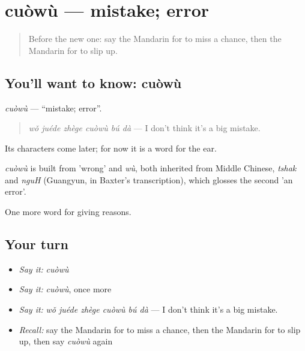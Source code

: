\section[cuòwù]{cuòwù — mistake; error}

\label{lesson:ZH-C356-cuowu}



\begin{quote}
Before the new one: say the Mandarin for to miss a chance, then the Mandarin for to slip up.
\end{quote}

\subsection*{You'll want to know: cuòwù}
\emph{cuòwù} — \textquotedblleft{}mistake; error\textquotedblright{}.

\begin{quote}
\emph{wǒ juéde zhège cuòwù bú dà} — I don't think it's a big mistake.
\end{quote}

Its characters come later; for now it is a word for the ear.

\begin{cousinweb}
\emph{cuòwù} is built from  'wrong' and \emph{wù}, both inherited from Middle Chinese, \emph{tshak} and \emph{nguH} (Guangyun, in Baxter's transcription), which glosses the second 'an error'.
\end{cousinweb}

\begin{grammarlens}[title={What you've built}]
One more word for giving reasons.
\end{grammarlens}

\subsection*{Your turn}
\begin{itemize}
\raggedright
  \item \emph{Say it:} \emph{cuòwù}
  \item \emph{Say it:} \emph{cuòwù}, once more
  \item \emph{Say it:} \emph{wǒ juéde zhège cuòwù bú dà} — I don't think it's a big mistake.
  \item \emph{Recall:} say the Mandarin for to miss a chance, then the Mandarin for to slip up, then say \emph{cuòwù} again
\end{itemize}

